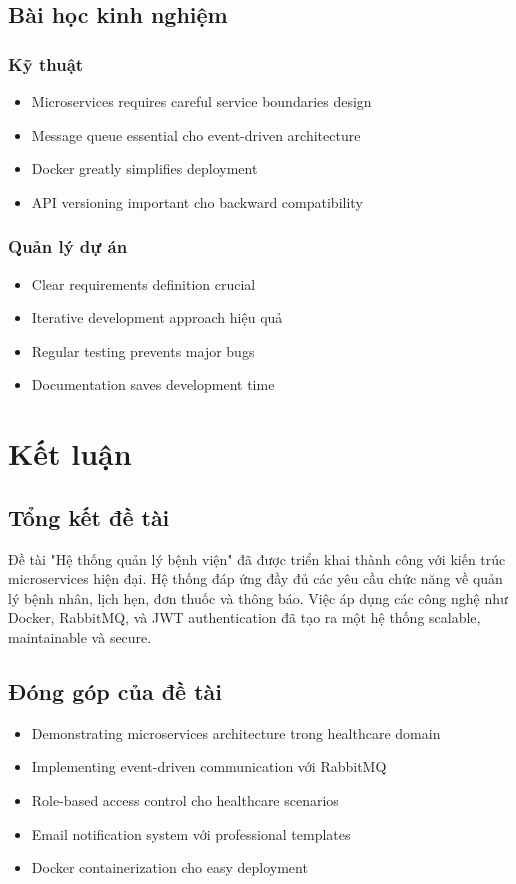 \documentclass[12pt,a4paper]{report}
\begin{document}
\section{Bài học kinh nghiệm}

\subsection{Kỹ thuật}
\begin{itemize}
    \item Microservices requires careful service boundaries design
    \item Message queue essential cho event-driven architecture
    \item Docker greatly simplifies deployment
    \item API versioning important cho backward compatibility
\end{itemize}

\subsection{Quản lý dự án}
\begin{itemize}
    \item Clear requirements definition crucial
    \item Iterative development approach hiệu quả
    \item Regular testing prevents major bugs
    \item Documentation saves development time
\end{itemize}

\chapter{Kết luận}

\section{Tổng kết đề tài}
Đề tài "Hệ thống quản lý bệnh viện" đã được triển khai thành công với kiến trúc microservices hiện đại. Hệ thống đáp ứng đầy đủ các yêu cầu chức năng về quản lý bệnh nhân, lịch hẹn, đơn thuốc và thông báo. Việc áp dụng các công nghệ như Docker, RabbitMQ, và JWT authentication đã tạo ra một hệ thống scalable, maintainable và secure.

\section{Đóng góp của đề tài}
\begin{itemize}
    \item Demonstrating microservices architecture trong healthcare domain
    \item Implementing event-driven communication với RabbitMQ
    \item Role-based access control cho healthcare scenarios
    \item Email notification system với professional templates
    \item Docker containerization cho easy deployment
\end{itemize}
\end{document}
